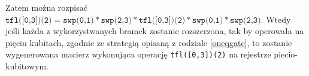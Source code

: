 Zatem można rozpisać $\texttt{tfl([0,3])(2)} = \texttt{swp(0,1)} * \texttt{swp(2,3)} * \texttt{tfl([0,3])(2)} * \texttt{swp(0,1)} * \texttt{swp(2,3)}$. Wtedy jeśli każda z wykorzystwanych bramek zostanie rozszerzona, tak by operowała na pięciu kubitach, zgodnie ze strategią opisaną z rodziale \ref{oneqgate}, to zostanie wygenerowana macierz wykonująca operację \texttt{tfl([0,3])(2)} na rejestrze piecio-kubitowym.
